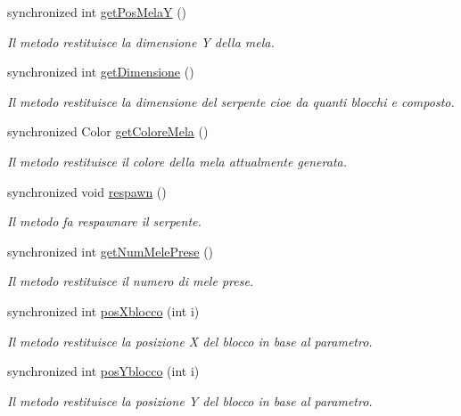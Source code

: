 \begin{DoxyCompactItemize}
synchronized int \mbox{\hyperlink{class_snake_1_1game_1_1gioco_a705cd114e2c4c31eb74a4107e9a3e1ae}{get\+Pos\+MelaY}} ()
\begin{DoxyCompactList}\small\item\em Il metodo restituisce la dimensione Y della mela. \end{DoxyCompactList}\item 
synchronized int \mbox{\hyperlink{class_snake_1_1game_1_1gioco_af0072e81eee8ca6f1aadbda23fa837c7}{get\+Dimensione}} ()
\begin{DoxyCompactList}\small\item\em Il metodo restituisce la dimensione del serpente cioe\textquotesingle{} da quanti blocchi e\textquotesingle{} composto. \end{DoxyCompactList}\item 
synchronized Color \mbox{\hyperlink{class_snake_1_1game_1_1gioco_a054f84dfe4bbfc78f789a4dc4203794b}{get\+Colore\+Mela}} ()
\begin{DoxyCompactList}\small\item\em Il metodo restituisce il colore della mela attualmente generata. \end{DoxyCompactList}\item 
synchronized void \mbox{\hyperlink{class_snake_1_1game_1_1gioco_acfb7d9e73cb8326f2ebf9e9cbfde836a}{respawn}} ()
\begin{DoxyCompactList}\small\item\em Il metodo fa respawnare il serpente. \end{DoxyCompactList}\item 
synchronized int \mbox{\hyperlink{class_snake_1_1game_1_1gioco_ab5f0b7048deda3c739c67b65166283cc}{get\+Num\+Mele\+Prese}} ()
\begin{DoxyCompactList}\small\item\em Il metodo restituisce il numero di mele prese. \end{DoxyCompactList}\item 
synchronized int \mbox{\hyperlink{class_snake_1_1game_1_1gioco_adaf82eb9ab0c17af1f56016eff67aa1d}{pos\+Xblocco}} (int i)
\begin{DoxyCompactList}\small\item\em Il metodo restituisce la posizione X del blocco in base al parametro. \end{DoxyCompactList}\item 
synchronized int \mbox{\hyperlink{class_snake_1_1game_1_1gioco_a6ced36b3bedd58f6363c964edb3b9b8d}{pos\+Yblocco}} (int i)
\begin{DoxyCompactList}\small\item\em Il metodo restituisce la posizione Y del blocco in base al parametro. \end{DoxyCompactList}\item 

\end{DoxyCompactItemize}
